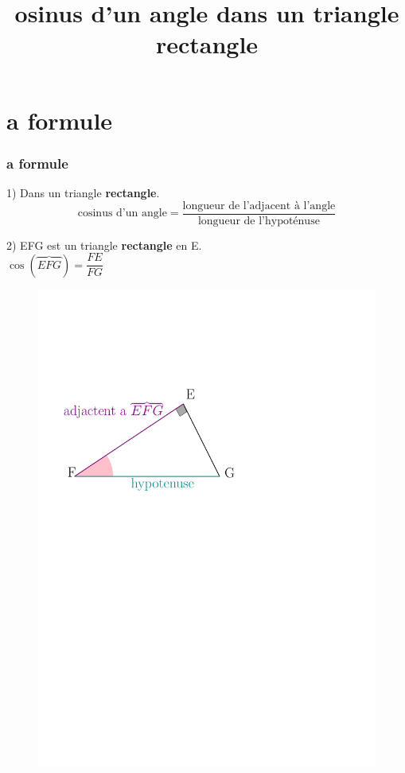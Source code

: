 \documentclass{beamer}
\title{{\rmfamily{\textsc{C}}}osinus d'un angle dans un triangle rectangle}
\begin{document}
\frame{\titlepage}

\section{{}a formule}

\begin{frame}
  \frametitle{{}a formule}

  \begin{block}{}
    1) Dans un triangle \textbf{rectangle}.
    $$\text{cosinus d'un angle} = \dfrac{\text{longueur de l'adjacent à l'angle}}{\text{longueur de l'hypoténuse}}$$ 
  \end{block}

  \begin{multicols}{2}
    \begin{block}{} 
      2) EFG est un triangle \textbf{rectangle} en E.\\
      $\cos(\overbrace{EFG}) = \dfrac{FE}{FG}$
    \end{block}

    
    \begin{figure}[H]
	    \centering
	    \includegraphics[width=\linewidth]{sources/2/tri-EFG.pdf}
	  \end{figure}
  \end{multicols}
\end{frame}
\end{document}
